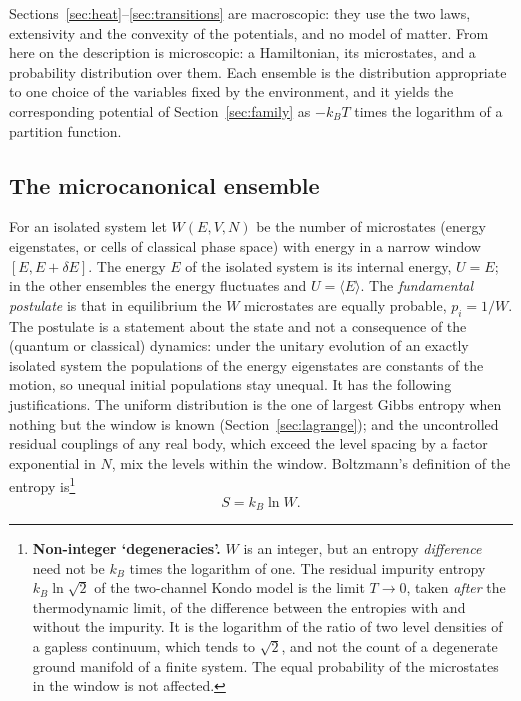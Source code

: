 \documentclass[10pt,a4paper]{article}
\theoremstyle{remark}
\begin{document}
Sections~\ref{sec:heat}--\ref{sec:transitions} are macroscopic: they use the
two laws, extensivity and the convexity of the potentials, and no model of
matter. From here on the description is microscopic: a Hamiltonian, its
microstates, and a probability distribution over them. Each ensemble is the
distribution appropriate to one choice of the variables fixed by the
environment, and it yields the corresponding potential of
Section~\ref{sec:family} as $-k_BT$ times the logarithm of a partition
function.

\subsection{The microcanonical ensemble}
\label{sec:microcanonical}

For an isolated system let $W(E,V,N)$ be the number of microstates (energy
eigenstates, or cells of classical phase space) with energy in a narrow window
$[E,E+\delta E]$. The energy $E$ of the isolated system is its internal
energy, $U=E$; in the other ensembles the energy fluctuates and
$U=\langle E\rangle$. The \emph{fundamental postulate} is that in equilibrium
the $W$ microstates are equally probable, $p_i=1/W$. The postulate is a
statement about the state and not a consequence of the (quantum or classical) dynamics:
under the unitary evolution of an exactly isolated system the
populations of the energy eigenstates are constants of the motion, so unequal initial populations stay
unequal. It has the following justifications. The uniform distribution is the one of
largest Gibbs entropy when nothing but the window is known
(Section~\ref{sec:lagrange}); and the uncontrolled residual couplings of any
real body, which exceed the level spacing by a factor exponential in $N$, mix
the levels within the window. Boltzmann's
definition of the entropy is\footnote{\label{fn:noninteger}\textbf{Non-integer
`degeneracies'.} $W$ is an integer, but an entropy \emph{difference} need not
be $k_B$ times the logarithm of one. The residual impurity entropy
$k_B\ln\sqrt2$ of the two-channel Kondo model is the limit $T\to0$, taken
\emph{after} the thermodynamic limit, of the difference between the entropies
with and without the impurity. It is the logarithm of the ratio of two level
densities of a gapless continuum, which tends to $\sqrt2$, and not the count
of a degenerate ground manifold of a finite system. The equal probability of
the microstates in the window is not affected.}
\begin{equation}\label{eq:boltzmann}
  S=k_B\ln W .
\end{equation}
\end{document}
